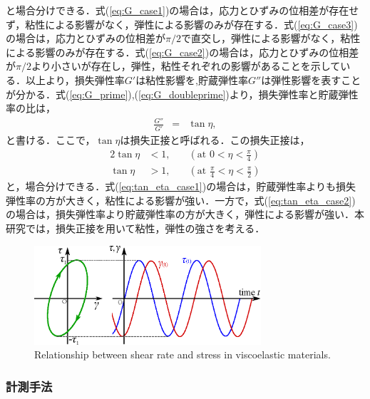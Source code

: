 と場合分けできる．式(\ref{eq:G_case1})の場合は，応力とひずみの位相差が存在せず，粘性による影響がなく，弾性による影響のみが存在する．式(\ref{eq:G_case3})の場合は，応力とひずみの位相差が$\pi/2$で直交し，弾性による影響がなく，粘性による影響のみが存在する．式(\ref{eq:G_case2})の場合は，応力とひずみの位相差が$\pi/2$より小さいが存在し，弾性，粘性それぞれの影響があることを示している．以上より，損失弾性率$G'$は粘性影響を,貯蔵弾性率$G''$は弾性影響を表すことが分かる．式(\ref{eq:G_prime}),(\ref{eq:G_doubleprime})より，損失弾性率と貯蔵弾性率の比は，
\begin{eqnarray}
    \frac{G''}{G'} &=& \tan\eta ,
    \label{eq:loss_factor}
\end{eqnarray}
と書ける．ここで，$\tan\eta$は損失正接と呼ばれる\cite{生物レオロジー}\cite{化学者のためのレオロジー}．この損失正接は，
\begin{alignat}{2}
    \tan\eta & < 1, & \quad \left(\text{at } 0<\eta<\frac{\pi}{4}\right)     \label{eq:tan_eta_case1}         \\
    \tan\eta & > 1, & \quad \left(\text{at } \frac{\pi}{4}<\eta<\frac{\pi}{2}\right) \label{eq:tan_eta_case2}
\end{alignat}
と，場合分けできる．式(\ref{eq:tan_eta_case1})の場合は，貯蔵弾性率よりも損失弾性率の方が大きく，粘性による影響が強い．一方で，式(\ref{eq:tan_eta_case2})の場合は，損失弾性率より貯蔵弾性率の方が大きく，弾性による影響が強い．本研究では，損失正接を用いて粘性，弾性の強さを考える．

\begin{figure}[ht]
    \centering
    \includegraphics[width=0.75\textwidth]{2-Methods/elasticity.eps}
    \caption{Relationship between shear rate and stress in viscoelastic materials.}
    \label{fig:elastic}
\end{figure}

\newpage

\subsubsection{計測手法}

